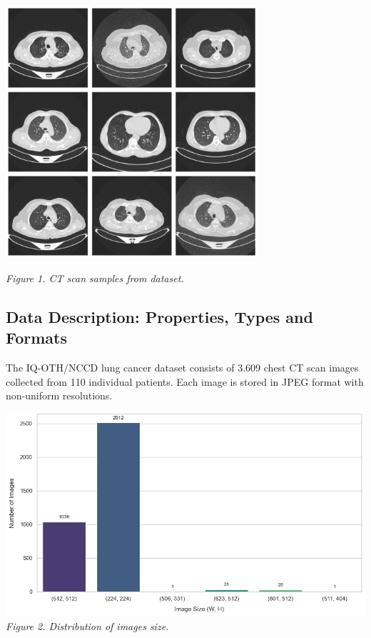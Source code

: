 \vspace{1em}
\begin{center} 
    \includegraphics[width=0.7\textwidth]{../assets/02-dataset/ct-scans.png} 

    \small\textit{Figure 1. CT scan samples from dataset.}
\end{center}
\vspace{1em}


\subsection{Data Description: Properties, Types and Formats}

The IQ-OTH/NCCD lung cancer dataset consists of 3.609 chest CT scan images collected from 110 
individual patients. Each image is stored in JPEG format with non-uniform resolutions. 

\vspace{1em}
\begin{center} 
    \includegraphics[width=\textwidth]{../assets/02-dataset/image-size-distribution.png}
    \small\textit{Figure 2. Distribution of images size.}
\end{center}
\vspace{1em}

